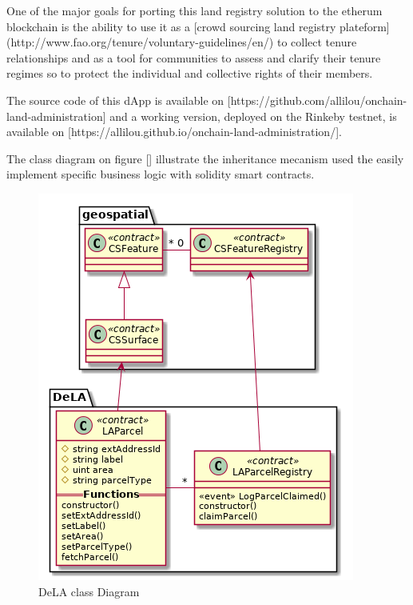 \documentclass{isprs} %
\begin{document}
One of the major goals for porting this land registry solution to the etherum blockchain is the ability to use it as a [crowd sourcing land registry plateform](http://www.fao.org/tenure/voluntary-guidelines/en/) to collect tenure relationships and as a tool for communities to assess and clarify their tenure regimes so to protect the individual and collective rights of their members. 

The source code of this dApp is available on [https://github.com/allilou/onchain-land-administration] and a working version, deployed on the Rinkeby testnet, is available on [https://allilou.github.io/onchain-land-administration/].

The class diagram on figure [] illustrate the inheritance mecanism used the easily implement specific business logic with solidity smart contracts.

\begin{figure}[ht!]
\begin{center}
		\includegraphics[width=1.0\columnwidth]{figures/class-dela.png}
	\caption{DeLA class Diagram}
\label{fig:figure_placement}
\end{center}
\end{figure}
\end{document}
